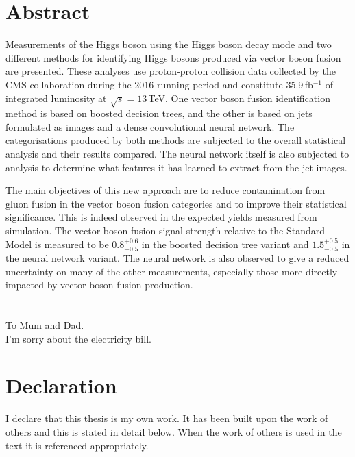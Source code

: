 

\chapter*{\centering Abstract}
Measurements of the Higgs boson using the \Hgg Higgs boson decay mode and two different methods for identifying Higgs bosons produced via vector boson fusion are presented.
These analyses use proton-proton collision data collected by the CMS collaboration during the 2016 running period and constitute 35.9\,fb$^{-1}$ of integrated luminosity at $\sqrt{s}=13$\,TeV.
One vector boson fusion identification method is based on boosted decision trees, and the other is based on jets formulated as images and a dense convolutional neural network. 
The categorisations produced by both methods are subjected to the overall \Hgg statistical analysis and their results compared.
The neural network itself is also subjected to analysis to determine what features it has learned to extract from the jet images.

The main objectives of this new approach are to reduce contamination from gluon fusion in the vector boson fusion categories and to improve their statistical significance. 
This is indeed observed in the expected yields measured from simulation.
The vector boson fusion signal strength relative to the Standard Model is measured to be $0.8^{+0.6}_{-0.5}$ in the boosted decision tree variant and $1.5^{+0.5}_{-0.5}$ in the neural network variant. 
The neural network is also observed to give a reduced uncertainty on many of the other measurements, especially those more directly impacted by vector boson fusion production.


\chapter*{\centering }%
\begin{center}
    \thispagestyle{empty}
    To Mum and Dad. \\
    I'm sorry about the electricity bill.
\end{center}


\chapter*{\centering Declaration}
I declare that this thesis is my own work. It has been built upon the work of others and this is stated in detail below. 
When the work of others is used in the text it is referenced appropriately.

